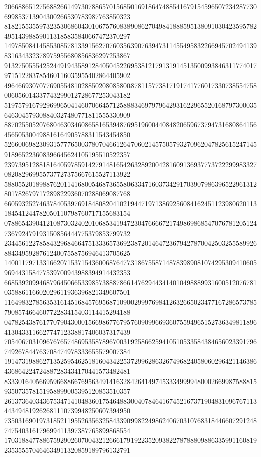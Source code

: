\begin{DoxyCode}
      206688651275688266149730788657015685016918647488541679154596507234287730699853713904300266530783987763850323
      818215535597323530686043010675760838908627049841888595138091030423595782495143988590113185835840667472370297
      149785084145853085781339156270760356390763947311455495832266945702494139831634332378975955680856836297253867
      913275055542524491943589128405045226953812179131914513500993846311774017971512283785460116035955402864405902
      496466930707769055481028850208085800878115773817191741776017330738554758006056014337743299012728677253043182
      519757916792969965041460706645712588834697979642931622965520168797300035646304579308840327480771811555330909
      887025505207680463034608658165394876951960044084820659673794731680864156456505300498816164905788311543454850
      526600698230931577765003780704661264706021457505793270962047825615247145918965223608396645624105195510522357
      239739512881816405978591427914816542632892004281609136937773722299983327082082969955737727375667615527113922
      588055201898876201141680054687365580633471603734291703907986396522961312801782679717289822936070288069087768
      660593252746378405397691848082041021944719713869256084162451123980620113184541244782050110798760717155683154
      078865439041210873032402010685341947230476666721749869868547076781205124736792479193150856444775379853799732
      234456122785843296846647513336573692387201464723679427870042503255589926884349592876124007558756946413705625
      140011797133166207153715436006876477318675587148783989081074295309410605969443158477539700943988394914432353
      668539209946879645066533985738887866147629443414010498889931600512076781035886116602029611936396821349607501
      116498327856353161451684576956871090029997698412632665023477167286573785790857466460772283415403114415294188
      047825438761770790430001566986776795760909966936075594965152736349811896413043311662774712338817406037317439
      705406703109676765748695358789670031925866259410510533584384656023391796749267844763708474978333655579007384
      191473198862713525954625181604342253729962863267496824058060296421146386436864224724887283434170441573482481
      833301640566959668866769563491416328426414974533349999480002669987588815935073578151958899005395120853510357
      261373640343675347141048360175464883004078464167452167371904831096767113443494819262681110739948250607394950
      735031690197318521195526356325843390998224986240670310768318446607291248747540316179699411397387765899868554
      170318847788675929026070043212666179192235209382278788809886335991160819235355570464634911320859189796132791

\end{DoxyCode}
